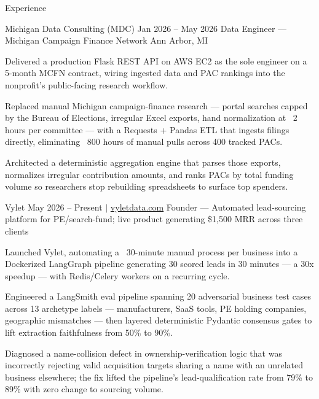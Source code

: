 \documentclass[
	11pt
]{../../../template}
\begin{document}
	\begin{rSection}{E}{xperience}
		\begin{rSectionEntry}
			{Michigan Data Consulting (MDC)}
			{Jan 2026 -- May 2026}
			{Data Engineer --- Michigan Campaign Finance Network}
			{}
			{Ann Arbor, MI}

			\item Delivered a production Flask REST API on AWS EC2 as the sole engineer on a 5-month MCFN contract, wiring ingested data and PAC rankings into the nonprofit's public-facing research workflow.
			\item Replaced manual Michigan campaign-finance research --- portal searches capped by the Bureau of Elections, irregular Excel exports, hand normalization at ~2 hours per committee --- with a Requests + Pandas ETL that ingests filings directly, eliminating ~800 hours of manual pulls across 400 tracked PACs.
			\item Architected a deterministic aggregation engine that parses those exports, normalizes irregular contribution amounts, and ranks PACs by total funding volume so researchers stop rebuilding spreadsheets to surface top spenders.
		\end{rSectionEntry}

		\begin{rSectionEntry}
			{Vylet}
			{May 2026 -- Present $\vert$ \href{https://vyletdata.com}{vyletdata.com}}
			{Founder --- Automated lead-sourcing platform for PE/search-fund; live product generating \$1,500 MRR across three clients}
			{}
			{}

			\item Launched Vylet, automating a ~30-minute manual process per business into a Dockerized LangGraph pipeline generating 30 scored leads in 30 minutes --- a 30x speedup --- with Redis/Celery workers on a recurring cycle.
			\item Engineered a LangSmith eval pipeline spanning 20 adversarial business test cases across 13 archetype labels --- manufacturers, SaaS tools, PE holding companies, geographic mismatches --- then layered deterministic Pydantic consensus gates to lift extraction faithfulness from 50\% to 90\%.
			\item Diagnosed a name-collision defect in ownership-verification logic that was incorrectly rejecting valid acquisition targets sharing a name with an unrelated business elsewhere; the fix lifted the pipeline's lead-qualification rate from 79\% to 89\% with zero change to sourcing volume.
		\end{rSectionEntry}


\end{rSection}
\end{document}
